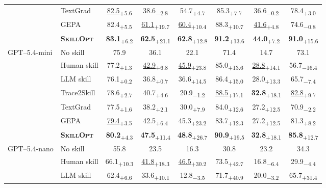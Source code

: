 \documentclass{llmxive}
\providecommand{\ourmethod}{\textsc{SkillOpt}\xspace}
\providecommand{\dvalp}[2]{\hphantom{\textsubscript{+#2}}#1\textsubscript{+#2}}
\providecommand{\dvaln}[2]{\hphantom{\textsubscript{$-$#2}}#1\textsubscript{$-$#2}}
\providecommand{\methodcell}[1]{\cellcolor{blue!8}#1}
\begin{document}
\begin{table}[!htbp]
\begin{tabular}{l l c c c c c c}
 & TextGrad & \dvalp{\underline{82.5}}{5.6} & \dvaln{38.6}{2.8} & \dvalp{54.7}{4.7} & \dvalp{85.3}{7.7} & \dvaln{36.6}{0.2} & \dvalp{78.4}{3.0} \\
 & GEPA & \dvalp{82.4}{5.5} & \dvalp{\underline{61.1}}{19.7} & \dvalp{\underline{60.4}}{10.4} & \dvalp{88.3}{10.7} & \dvalp{\underline{41.6}}{4.8} & \dvaln{74.6}{0.8} \\
 & \methodcell{\textbf{\ourmethod{}}} & \methodcell{\dvalp{\textbf{83.1}}{6.2}} & \methodcell{\dvalp{\textbf{62.5}}{21.1}} & \methodcell{\dvalp{\textbf{62.8}}{12.8}} & \methodcell{\dvalp{\textbf{91.2}}{13.6}} & \methodcell{\dvalp{\textbf{44.0}}{7.2}} & \methodcell{\dvalp{\textbf{91.0}}{15.6}} \\
\cmidrule(lr){1-8}
\multirow{7}{*}{GPT--5.4-mini} & No skill & 75.9 & 36.1 & 22.1 & 71.4 & 14.7 & 73.1 \\
 & Human skill & \dvalp{77.2}{1.3} & \dvalp{\underline{42.9}}{6.8} & \dvalp{\underline{45.9}}{23.8} & \dvalp{85.0}{13.6} & \dvalp{\underline{28.8}}{14.1} & \dvaln{56.7}{16.4} \\
 & LLM skill & \dvalp{76.1}{0.2} & \dvalp{36.8}{0.7} & \dvalp{36.6}{14.5} & \dvalp{86.4}{15.0} & \dvalp{28.0}{13.3} & \dvaln{65.7}{7.4} \\
 & Trace2Skill & \dvalp{78.6}{2.7} & \dvalp{40.7}{4.6} & \dvaln{20.9}{1.2} & \dvalp{\underline{88.5}}{17.1} & \dvalp{\textbf{32.8}}{18.1} & \dvalp{\underline{82.8}}{9.7} \\
 & TextGrad & \dvalp{77.5}{1.6} & \dvalp{38.2}{2.1} & \dvalp{30.0}{7.9} & \dvalp{84.0}{12.6} & \dvalp{27.2}{12.5} & \dvaln{70.9}{2.2} \\
 & GEPA & \dvalp{\underline{79.4}}{3.5} & \dvalp{42.5}{6.4} & \dvalp{45.3}{23.2} & \dvalp{83.7}{12.3} & \dvalp{27.2}{12.5} & \dvalp{81.3}{8.2} \\
 & \methodcell{\textbf{\ourmethod{}}} & \methodcell{\dvalp{\textbf{80.2}}{4.3}} & \methodcell{\dvalp{\textbf{47.5}}{11.4}} & \methodcell{\dvalp{\textbf{48.8}}{26.7}} & \methodcell{\dvalp{\textbf{90.9}}{19.5}} & \methodcell{\dvalp{\textbf{32.8}}{18.1}} & \methodcell{\dvalp{\textbf{85.8}}{12.7}} \\
\cmidrule(lr){1-8}
\multirow{7}{*}{GPT--5.4-nano} & No skill & 55.8 & 23.5 & 16.3 & 30.8 & 23.2 & 34.3 \\
 & Human skill & \dvalp{66.1}{10.3} & \dvalp{\underline{41.8}}{18.3} & \dvalp{\underline{46.5}}{30.2} & \dvalp{73.5}{42.7} & \dvaln{16.8}{6.4} & \dvaln{29.9}{4.4} \\
 & LLM skill & \dvalp{62.4}{6.6} & \dvalp{33.6}{10.1} & \dvaln{12.8}{3.5} & \dvalp{71.7}{40.9} & \dvaln{20.0}{3.2} & \dvalp{65.7}{31.4} \\

\end{tabular}
\end{table}
\end{document}

